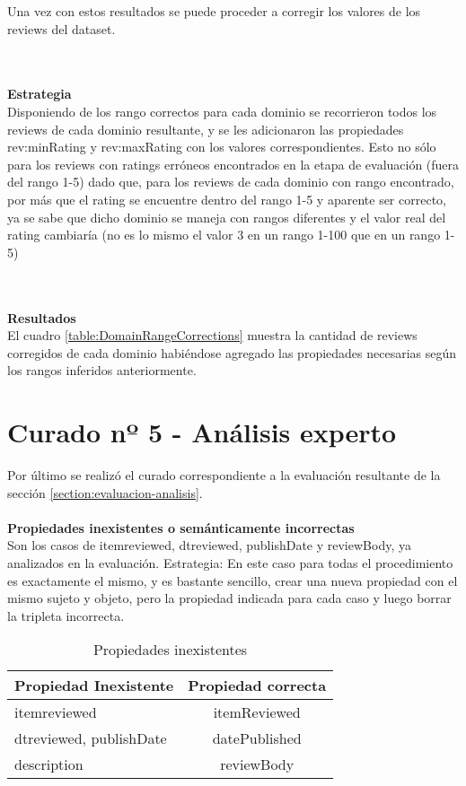 Una vez con estos resultados se puede proceder a corregir los valores de los reviews del dataset.

~\\\\\textbf{Estrategia}\\
Disponiendo de los rango correctos para cada dominio se recorrieron todos los reviews de cada dominio resultante, y se les adicionaron 
las propiedades rev:minRating y rev:maxRating con los valores correspondientes.
Esto no sólo para los reviews con ratings erróneos encontrados en la etapa de evaluación (fuera del rango 1-5) dado que, para los reviews de 
cada dominio con rango encontrado, por más que el rating se encuentre dentro del rango 1-5 y aparente ser correcto,  ya se sabe que dicho dominio se 
maneja con rangos diferentes y el valor real del rating cambiaría (no es lo mismo el valor 3 en un rango 1-100 que en un rango 1-5)

~\\\\\textbf{Resultados}\\
El cuadro \ref{table:DomainRangeCorrections} muestra la cantidad de reviews corregidos de cada dominio habiéndose agregado las 
propiedades necesarias según los rangos inferidos anteriormente.

\section{Curado nº 5 - Análisis experto}
\label{section:curado-analisis}
\noindent Por último se realizó el curado correspondiente a la evaluación resultante de la sección \ref{section:evaluacion-analisis}.
\\\\
\textbf{Propiedades inexistentes o semánticamente incorrectas}\\
Son los casos de itemreviewed, dtreviewed, publishDate y reviewBody, ya analizados en la evaluación.
Estrategia: En este caso para todas el procedimiento es exactamente el mismo, y es bastante sencillo, crear una nueva propiedad con 
el mismo sujeto y objeto, pero la propiedad indicada para cada caso y luego borrar la tripleta incorrecta.\\

\begin{table}[h]
\begin{tabular}{| l | c |}\hline
 Propiedad Inexistente & Propiedad correcta \\\hline
 itemreviewed & itemReviewed\\
 dtreviewed, publishDate & datePublished\\
 description & reviewBody\\\hline
\end{tabular}
\caption{Propiedades inexistentes}
\label{table:UndefinedProps}
\end{table}

